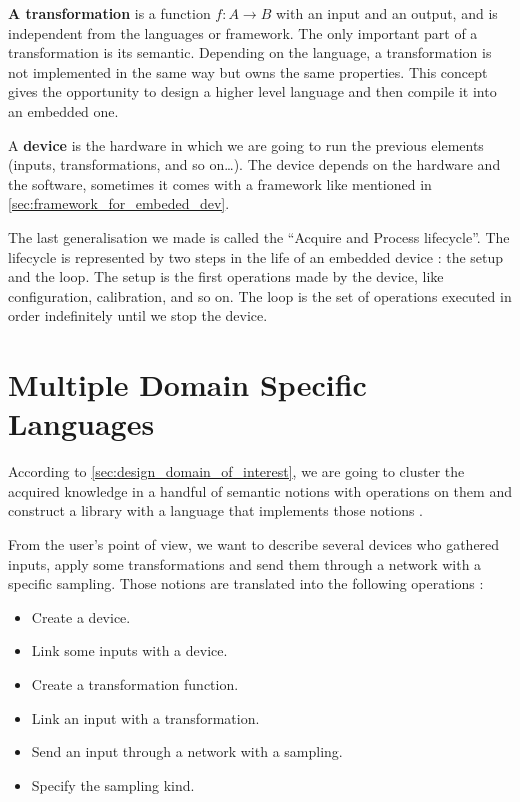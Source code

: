 \textbf{A transformation} is a function $f : A \rightarrow B$ with an input
and an output, and is independent from the languages or framework.
The only important part of a transformation is its semantic. Depending on the
language, a transformation is not implemented in the same way but owns the same
properties. This concept gives the opportunity to design a higher level
language and then compile it into an embedded one.

A \textbf{device} is the hardware in which we are going to run the previous elements
(inputs, transformations, and so on…). The device depends on the hardware and
the software, sometimes it comes with a framework like mentioned
in \ref{sec:framework_for_embeded_dev}.

The last generalisation we made is called the ``Acquire and Process lifecycle''.
The lifecycle is represented by two steps in the life of an embedded device : the
setup and the loop. The setup is the first operations made by the device, like
configuration, calibration, and so on. The loop is the set of operations
executed in order indefinitely until we stop the device.

\section{Multiple Domain Specific Languages}
\label{sec:multiple_dsl}

According to \ref{sec:design_domain_of_interest}, we are going to cluster the acquired
knowledge in a handful of semantic notions with operations on them and construct
a library with a language that implements those notions
\cite{little_languages_little_maintenance}.

From the user's point of view, we want to describe several devices who gathered
inputs, apply some transformations and send them through a network with a
specific sampling. Those notions are translated into the following operations :

\begin{itemize}
\item Create a device.
\item Link some inputs with a device.
\item Create a transformation function.
\item Link an input with a transformation.
\item Send an input through a network with a sampling.
\item Specify the sampling kind.
\end{itemize}


